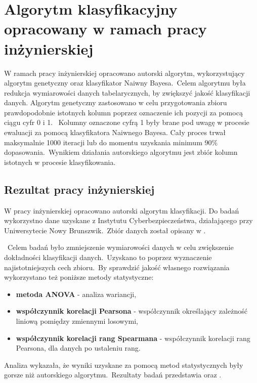 \chapter{Algorytm klasyfikacyjny opracowany w ramach pracy inżynierskiej}
W ramach pracy inżynierskiej opracowano autorski algorytm, wykorzystujący algorytm genetyczny oraz klasyfikator Naiwny Bayesa.\ Celem algorytmu była redukcja wymiarowości danych tabelarycznych, by zwiększyć jakość klasyfikacji danych. Algorytm genetyczny zastosowano w celu przygotowania zbioru prawdopodobnie istotnych kolumn poprzez oznaczenie ich pozycji za pomocą ciągu cyfr 0 i 1.  \ Kolumny oznaczone cyfrą 1 były brane pod uwagę w procesie ewaluacji za pomocą klasyfikatora Naiwnego Bayesa. Cały proces trwał maksymalnie 1000 iteracji lub do momentu uzyskania minimum $90\%$ dopasowania.\ Wynikiem działania autorskiego algorytmu jest zbiór kolumn istotnych w procesie klasyfikowania.

\section{Rezultat pracy inżynierskiej}
W pracy inżynierskiej opracowano autorski algorytm klasyfikacji. Do badań wykorzystno dane uzyskane z Instytutu Cyberbezpieczeństwa, działającego przy Uniwersytecie Nowy Brunszwik.\ Zbiór danych został opisany w .

\ Celem badań było zmniejszenie wymiarowości danych w celu zwiększenie dokładności klasyfikacji danych.\ Uzyskano to poprzez wyznaczenie najistotniejszych cech zbioru.\ By sprawdzić jakość własnego rozwiązania wykorzystano też poniższe metody statystyczne:
\begin{itemize}
    \item \textbf{metoda ANOVA} - analiza wariancji,
    \item \textbf{współczynnik korelacji Pearsona} - współczynnik określający zależność liniową pomiędzy zmiennymi losowymi,
    \item \textbf{współczynnik korelacji rang Spearmana} - współczynnik korelacji rang Pearsona, dla danych po ustaleniu rang.
\end{itemize}

Analiza wykazała, że wyniki uzyskane za pomocą metod statystycznych były gorsze niż autorskiego algorytmu.\ Rezultaty badań przedstawia  oraz .\


